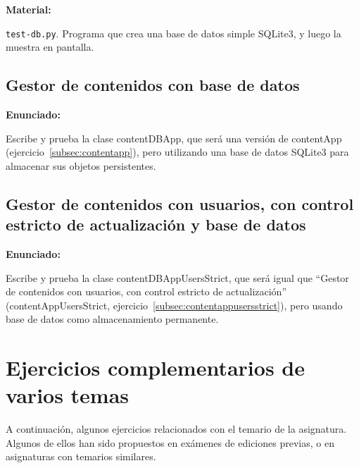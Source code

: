 \textbf{Material:}

\texttt{test-db.py}. Programa que crea una base de datos simple SQLite3, y luego la muestra en pantalla.

\subsection{Gestor de contenidos con base de datos}
\label{subsec:gestor-contenidos-bbdd}

\textbf{Enunciado:}

Escribe y prueba la clase contentDBApp, que será una versión de contentApp (ejercicio~\ref{subsec:contentapp}), pero utilizando una base de datos SQLite3 para almacenar sus objetos persistentes.

\subsection{Gestor de contenidos con usuarios, con control estricto de actualización y base de datos}
\label{subsec:gestor-contenidos-usuarios-bbdd}

\textbf{Enunciado:}

Escribe y prueba la clase contentDBAppUsersStrict, que será igual que ``Gestor de contenidos con usuarios, con control estricto de actualización'' (contentAppUsersStrict, ejercicio~\ref{subsec:contentappusersstrict}), pero usando base de datos como almacenamiento permanente.

\newpage




\section{Ejercicios complementarios de varios temas}

A continuación, algunos ejercicios relacionados con el temario de la asignatura. Algunos de ellos han sido propuestos en exámenes de ediciones previas, o en asignaturas con temarios similares.

